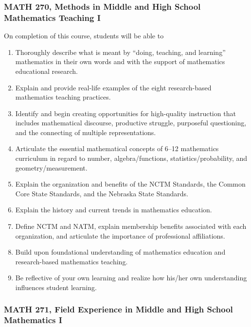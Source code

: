 \documentclass[11pt]{article}
\newenvironment{alphalist}{
\begin{enumerate}[label=(\arabic*),widest=107 ,leftmargin=25pt, itemsep=0pt]}
{\end{enumerate}}
\begin{document}
\subsubsection{MATH 270, Methods in Middle and High School Mathematics Teaching I}

On completion of this course, students will be able to
\begin{alphalist}
\item Thoroughly describe what is meant by ``doing, teaching, and learning'' mathematics in their own words and with the support of mathematics educational research.
\item Explain and provide real-life examples of the eight research-based mathematics teaching practices.
\item Identify and begin creating opportunities for high-quality instruction that includes mathematical discourse, productive struggle, purposeful questioning, and the connecting of multiple representations.
\item Articulate the essential mathematical concepts of 6--12 mathematics curriculum in regard to number, algebra/functions, statistics/probability, and geometry/measurement.
\item Explain the organization and benefits of the NCTM Standards, the Common Core State Standards, and the Nebraska State Standards.
\item Explain the history and current trends in mathematics education.
\item Define NCTM and NATM, explain membership benefits associated with each organization, and articulate the importance of professional affiliations.
\item Build upon foundational understanding of mathematics education and research-based mathematics teaching.
\item Be reflective of your own learning and realize how his/her own understanding influences student learning.
\end{alphalist}

\subsubsection{MATH 271, Field Experience in Middle and High School Mathematics I}
\end{document}
